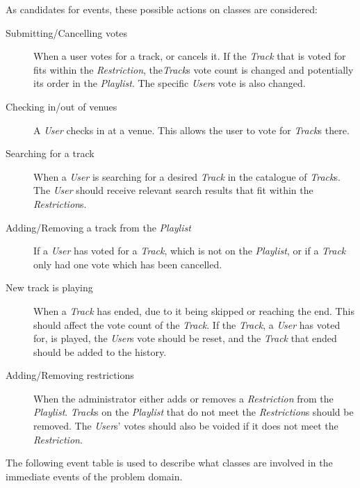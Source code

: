 As candidates for events, these possible actions on classes are considered:
\begin{description}

\item[Submitting/Cancelling votes]
    When a user votes for a track, or cancels it. If the \textit{Track} that is voted for fits within the \textit{Restriction}, the\textit{Track}s vote count is changed and potentially its order in the \textit{Playlist}. The specific \textit{User}s vote is also changed.

\item[Checking in/out of venues]
    A \textit{User} checks in at a venue. This allows the user to vote for \textit{Track}s there.

\item[Searching for a track]
    When a \textit{User} is searching for a desired \textit{Track} in the catalogue of \textit{Track}s. The \textit{User} should receive relevant search results that fit within the \textit{Restriction}s.

\item[Adding/Removing a track from the \textit{Playlist}]
    If a \textit{User} has voted for a \textit{Track}, which is not on the \textit{Playlist}, or if a \textit{Track} only had one vote which has been cancelled.

\item[New track is playing]
    When a \textit{Track} has ended, due to it being skipped or
    reaching the end. This should affect the vote count of the
    \textit{Track}. If the \textit{Track}, a \textit{User} has voted
    for, is played, the \textit{User}s vote should be reset, and the
    \textit{Track} that ended should be added to the history.

\item[Adding/Removing restrictions]
    When the administrator either adds or removes a \textit{Restriction} from the \textit{Playlist}. \textit{Track}s on the \textit{Playlist} that do not meet the \textit{Restriction}s should be removed. The \textit{User}s' votes should also be voided if it does not meet the \textit{Restriction}.

\end{description}

The following event table is used to describe what classes are involved in the immediate events of the problem domain.

